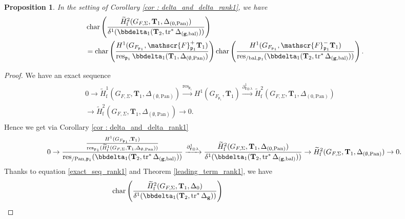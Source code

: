\documentclass[10pt]{amsart}
\numberwithin{equation}{section}
\newtheorem{prop}[thm]{Proposition}
\theoremstyle{definition}
\theoremstyle{remark} %
\DeclareMathOperator{\Char}{char}
\newcommand{\pan}{\mathrm{Pan}}
\DeclareMathOperator{\res}{res}
\DeclareMathOperator{\tr}{{tr}^*}
\renewcommand{\b}{\mathrm{bal}}
\newcommand{\f}{\mathbf{f}}
\newcommand{\scrF}{\mathscr{F}}
\newcommand{\g}{\mathbf{g}}
\newcommand{\p}{\mathfrak{p}}
\newcommand{\T}{\mathbf{T}}
\begin{document}
		\begin{prop}\label{prop : final_rank1}
			In the setting of Corollary \ref{cor : delta_and_delta_rank1}, we have 
			\begin{align*}
				&\Char\left( \dfrac{\widetilde{H}^2_{\mathrm{f}}(G_{F,\Sigma}, \T_1, \Delta_{(0,\pan)})}{\delta^1(\bbdelta_1(\T_{2}, \tr\Delta_{(\g,\b)}))} \right) \\
				&= \Char\left(  \frac{H^1(G_{F_{\p_1}},\scrF^+_{\p_1} \T_{1})}{\res_{\p_1}\bbdelta_1(\T_{1},\Delta_{(\emptyset,\pan)}) }\right) \Char\left( \frac{H^1(G_{F_{\p_1}},\scrF^-_{\p_1} \T_{1})}{ \res_{/\b, \p_1}(\bbdelta_1(\T_2, \operatorname{tr}^*\Delta_{(\g,\b)}))} \right).
			\end{align*} 
			
		\end{prop}
		\begin{proof}
			We have an exact sequence
			\begin{align}
				\begin{aligned}
					0 \rightarrow \widetilde{H}^1_{\mathrm{f}}(G_{F,\Sigma}, \T_1, \Delta_{(\emptyset,\pan)}) \xrightarrow{\res_{\p_1}} H^1(G_{F_{\p_1}},\T_{1}) \xrightarrow{\partial_{\f \otimes \lambda}^1} \widetilde{H}^2_{\mathrm{f}}(G_{F,\Sigma}, \T_1, \Delta_{(0,\pan)}) \qquad \qquad \\ \rightarrow \widetilde{H}^2_{\mathrm{f}}(G_{F,\Sigma}, \T_1, \Delta_{(\emptyset,\pan)}) \rightarrow 0.
				\end{aligned}
			\end{align}
			Hence we get via Corollary \ref{cor : delta_and_delta_rank1}
			\begin{align}
				0 \rightarrow \dfrac{\frac{H^1(G_{F_{\p_1}},\T_{1})}{\res_{\p_1}(\widetilde{H}^1_{\mathrm{f}}(G_{F,\Sigma},\T_{1}, \Delta_{{\emptyset, \pan}})) }}{\res_{/\pan, \p_1}(\bbdelta_1(\T_2, \operatorname{tr}^*\Delta_{(\g,\b)}))} \xrightarrow{\partial_{\f \otimes \lambda}^1} \dfrac{\widetilde{H}^2_{\mathrm{f}}(G_{F,\Sigma}, \T_1, \Delta_{(0,\pan)})}{\delta^1(\bbdelta_1(\T_{2}, \tr\Delta_{(\g,\b)}))} \rightarrow \widetilde{H}^2_{\mathrm{f}}(G_{F,\Sigma}, \T_1, \Delta_{(\emptyset,\pan)}) \rightarrow 0.
			\end{align}
			Thanks to equation \ref{exact_seq_rank1} and Theorem \ref{leading_term_rank1}, we have 
			\begin{align}
				\begin{aligned}
					&\Char\left( \dfrac{\widetilde{H}^2_{\mathrm{f}}(G_{F,\Sigma}, \T_1, \Delta_{0})}{\delta^1(\bbdelta_1(\T_{2}, \tr\Delta_{\g}))} \right)\qquad \qquad \qquad \qquad \qquad \qquad \qquad \qquad \\

\end{aligned}
\end{align}
\end{proof}
\end{document}
